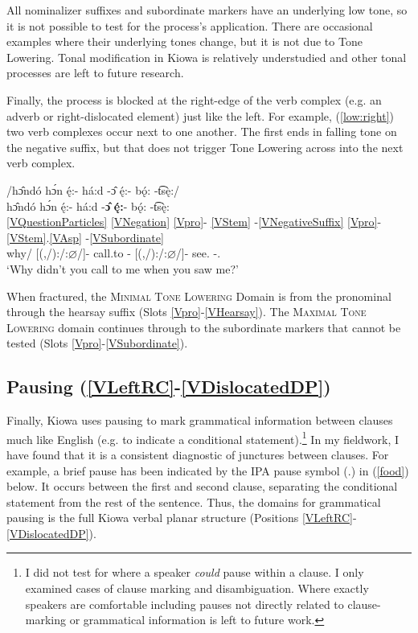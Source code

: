 \documentclass[output=paper]{langscibook}
\begin{document}
All nominalizer suffixes and subordinate markers have an underlying low tone, so it is not possible to test for the process's application. There are occasional examples where their underlying tones change, but it is not due to Tone Lowering. Tonal modification in Kiowa is relatively understudied and other tonal processes are left to future research. 

Finally, the process is blocked at the right-edge of the verb complex (e.g. an adverb or right-dislocated element) just like the left. For example, (\ref{low:right}) two verb complexes occur next to one another. The first ends in falling tone on the negative suffix, but that does not trigger Tone Lowering across into the next verb complex. 

\ea \label{low:right}
\gllll /h\^{ɔ}ndó h\'{ɔ}n \k{é}:- há:d -\^{ɔ} \k{é}:- b\k{ó}: -t͡s\k{è}:/\\
h\^{ɔ}ndó h\'{ɔ}n \k{é}:- há:d -\textbf{\^{ɔ}} \textbf{\k{é}:}- b\k{ó}: -t͡s\k{è}:\\
\ref{VQuestionParticles} \ref{VNegation} {\ref{Vpro}}- \ref{VStem} -\ref{VNegativeSuffix} {\ref{Vpro}}- \ref{VStem}.\ref{VAsp} -\ref{VSubordinate}\\
why/{\Q} {\Neg} [(\Second,\Third\Sg/\Aarg):\First\Sg/\Parg:$\varnothing$/\Obj]- call.to -{\Neg} [(\Second,\Third\Sg/\Aarg):\First\Sg/\Parg:$\varnothing$/\Obj]- see.{\Pfv} -{\When}.{\Same} \\
\trans `Why didn't you call to me when you saw me?' \citep[][240]{Watkins:1984}
\z 

When fractured, the \textsc{Minimal Tone Lowering} Domain is from the pronominal through the hearsay suffix (Slots \ref{Vpro}-\ref{VHearsay}). The \textsc{Maximal Tone Lowering} domain continues through to the subordinate markers that cannot be tested (Slots \ref{Vpro}-\ref{VSubordinate}). 

\subsection{Pausing (\ref{VLeftRC}-\ref{VDislocatedDP})} \label{sec:pausing}

Finally, Kiowa uses pausing to mark grammatical information between clauses much like English (e.g. to indicate a conditional statement).\footnote{I did not test for where a speaker \textit{could} pause within a clause. I only examined cases of clause marking and disambiguation. Where exactly speakers are comfortable including pauses not directly related to clause-marking or grammatical information is left to future work.} In my fieldwork, I have found that it is a consistent diagnostic of junctures between clauses. For example, a brief pause has been indicated by the IPA pause symbol (.) in (\ref{food}) below. It occurs between the first and second clause, separating the conditional statement from the rest of the sentence. Thus, the domains for grammatical pausing is the full Kiowa verbal planar structure (Positions \ref{VLeftRC}-\ref{VDislocatedDP}). 
\end{document}
